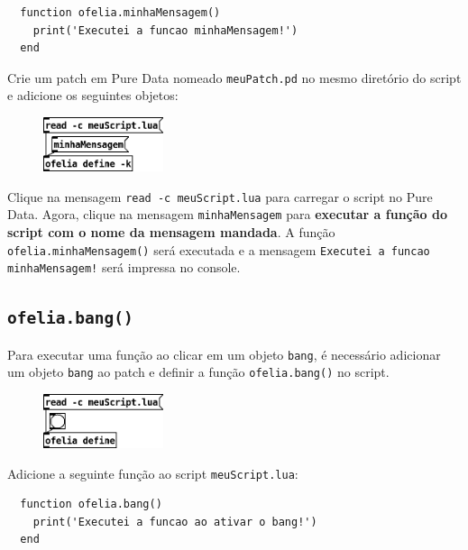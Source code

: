 \documentclass{article}
\begin{document}
\begin{center}
  \begin{lstlisting}
  function ofelia.minhaMensagem()
    print('Executei a funcao minhaMensagem!')
  end
  \end{lstlisting}
\end{center}

Crie um patch em Pure Data nomeado \texttt{meuPatch.pd} no mesmo diretório do script e adicione os seguintes objetos:

\begin{figure}[h]
  \centering
  \includegraphics[width=100pt]{passo1.png}
\end{figure}

Clique na mensagem \texttt{read -c meuScript.lua} para carregar o script no Pure Data. Agora, clique na mensagem \texttt{minhaMensagem} para \textbf{executar a função do script com o nome da mensagem mandada}. A função \texttt{ofelia.minhaMensagem()} será executada e a mensagem \texttt{Executei a funcao minhaMensagem!} será impressa no console.

\subsection{\texttt{ofelia.bang()}}

Para executar uma função ao clicar em um objeto \texttt{bang}, é necessário adicionar um objeto \texttt{bang} ao patch e definir a função \texttt{ofelia.bang()} no script.

\begin{figure}[H]
  \centering
  \includegraphics[width=100pt]{bang.png}
\end{figure}

Adicione a seguinte função ao script \texttt{meuScript.lua}:

\begin{center}
  \begin{lstlisting}
  function ofelia.bang()
    print('Executei a funcao ao ativar o bang!')
  end
  \end{lstlisting}
\end{center}
\end{document}
